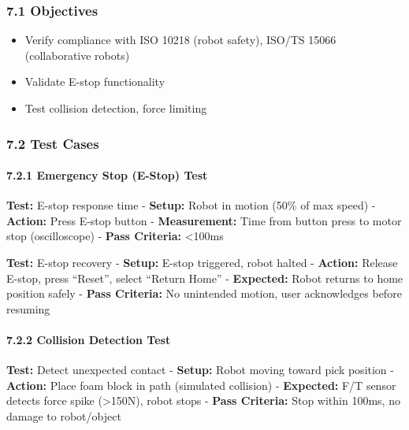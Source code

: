 \documentclass[
]{article}
\providecommand{\tightlist}{%
  \setlength{\itemsep}{0pt}\setlength{\parskip}{0pt}}
\begin{document}
\hypertarget{objectives-4}{%
\subsubsection{7.1 Objectives}\label{objectives-4}}

\begin{itemize}
\tightlist
\item
  Verify compliance with ISO 10218 (robot safety), ISO/TS 15066
  (collaborative robots)
\item
  Validate E-stop functionality
\item
  Test collision detection, force limiting
\end{itemize}

\hypertarget{test-cases-1}{%
\subsubsection{7.2 Test Cases}\label{test-cases-1}}

\hypertarget{emergency-stop-e-stop-test}{%
\paragraph{7.2.1 Emergency Stop (E-Stop)
Test}\label{emergency-stop-e-stop-test}}

\textbf{Test:} E-stop response time - \textbf{Setup:} Robot in motion
(50\% of max speed) - \textbf{Action:} Press E-stop button -
\textbf{Measurement:} Time from button press to motor stop
(oscilloscope) - \textbf{Pass Criteria:} \textless100ms

\textbf{Test:} E-stop recovery - \textbf{Setup:} E-stop triggered, robot
halted - \textbf{Action:} Release E-stop, press ``Reset'', select
``Return Home'' - \textbf{Expected:} Robot returns to home position
safely - \textbf{Pass Criteria:} No unintended motion, user acknowledges
before resuming

\hypertarget{collision-detection-test}{%
\paragraph{7.2.2 Collision Detection
Test}\label{collision-detection-test}}

\textbf{Test:} Detect unexpected contact - \textbf{Setup:} Robot moving
toward pick position - \textbf{Action:} Place foam block in path
(simulated collision) - \textbf{Expected:} F/T sensor detects force
spike (\textgreater150N), robot stops - \textbf{Pass Criteria:} Stop
within 100ms, no damage to robot/object
\end{document}
